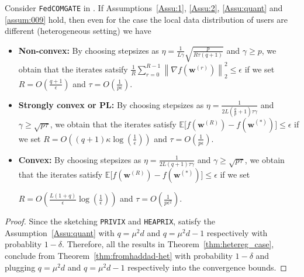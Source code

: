 \documentclass[review,onefignum,onetabnum]{siamart190516}
\begin{document}
\begin{theorem}\label{thm:fromhaddad-het}
 Consider \texttt{FedCOMGATE} in \cite{haddadpour2020federated}. If Assumptions~\ref{Assu:1}, \ref{Assu:2}, \ref{Assu:quant}  and \ref{assum:009} hold, then even for the case the local data distribution of users are different  (heterogeneous setting) we have
 \begin{itemize}
     \item \textbf{Non-convex:} By choosing stepsizes as $\eta=\frac{1}{L\gamma}\sqrt{\frac{p}{R\tau\left(q+1\right)}}$ and $\gamma\geq p$, we obtain that the iterates satsify  $\frac{1}{R}\sum_{r=0}^{R-1}\left\|\nabla f({\boldsymbol{w}}^{(r)})\right\|_2^2\leq \epsilon$ if we set
     $R=O\left(\frac{q+1}{\epsilon}\right)$ and $ \tau=O\left(\frac{1}{p\epsilon}\right)$.
     \item \textbf{Strongly convex or PL:}
      By choosing stepsizes as $\eta=\frac{1}{2L\left(\frac{q}{p}+1\right)\tau\gamma}$ and ${\gamma\geq \sqrt{p\tau}}$, we obtain that the iterates satisfy $\mathbb{E}\Big[f({\boldsymbol{w}}^{(R)})-f({\boldsymbol{w}}^{(*)})\Big]\leq \epsilon$ if we set
      $R=O\left(\left(q+1\right)\kappa\log\left(\frac{1}{\epsilon}\right)\right)$ and $ \tau=O\left(\frac{1}{p\epsilon}\right)$.
     \item \textbf{Convex:}  By choosing stepsizes as $\eta=\frac{1}{2L\left(q+1\right)\tau\gamma}$ and ${\gamma\geq \sqrt{p\tau}}$, we obtain that the iterates satisfy $\mathbb{E}\Big[f({\boldsymbol{w}}^{(R)})-f({\boldsymbol{w}}^{(*)})\Big]\leq \epsilon$ if we set
     
     $R=O\left(\frac{L\left(1+q\right)}{\epsilon}\log\left(\frac{1}{\epsilon}\right)\right)$ and $ \tau=O\left(\frac{1}{p\epsilon^2}\right)$.
 \end{itemize}
 
\end{theorem}
\begin{proof}
Since the sketching \texttt{PRIVIX} and \texttt{HEAPRIX}, satisfy the Assumption~\ref{Assu:quant} with $q=\mu^2d$ and $q=\mu^2d-1$ respectively with probablity $1-\delta$.  Therefore, all the results in Theorem~\ref{thm:hetereg_case}, conclude from Theorem~\ref{thm:fromhaddad-het} with probability $1-\delta$ and plugging $q=\mu^2d$ and $q=\mu^2d-1$ respectively into the convergence bounds.
\end{proof}
\end{document}
